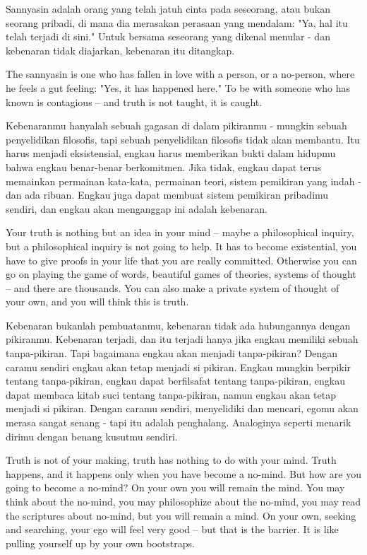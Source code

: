 \bahasa
Sannyasin adalah orang yang telah jatuh cinta pada seseorang, atau bukan seorang pribadi, di mana dia merasakan perasaan yang mendalam: "Ya, hal itu telah terjadi di sini." Untuk bersama seseorang yang dikenal menular - dan kebenaran tidak diajarkan, kebenaran itu ditangkap.

\english
The sannyasin is one who has fallen in love with a person, or a no-person, where he feels a gut feeling: "Yes, it has happened here." To be with someone who has known is contagious -- and truth is not taught, it is caught.

\bahasa
Kebenaranmu hanyalah sebuah gagasan di dalam pikiranmu - mungkin sebuah penyelidikan filosofis, tapi sebuah penyelidikan filosofis tidak akan membantu. Itu harus menjadi eksistensial, engkau harus memberikan bukti dalam hidupmu bahwa engkau benar-benar berkomitmen. Jika tidak, engkau dapat terus memainkan permainan kata-kata, permainan teori, sistem pemikiran yang indah - dan ada ribuan. Engkau juga dapat membuat sistem pemikiran pribadimu sendiri, dan engkau akan menganggap ini adalah kebenaran.

\english
Your truth is nothing but an idea in your mind -- maybe a philosophical inquiry, but a philosophical inquiry is not going to help. It has to become existential, you have to give proofs in your life that you are really committed. Otherwise you can go on playing the game of words, beautiful games of theories, systems of thought -- and there are thousands. You can also make a private system of thought of your own, and you will think this is truth.

\bahasa
Kebenaran bukanlah pembuatanmu, kebenaran tidak ada hubungannya dengan pikiranmu. Kebenaran terjadi, dan itu terjadi hanya jika engkau memiliki sebuah tanpa-pikiran. Tapi bagaimana engkau akan menjadi tanpa-pikiran? Dengan caramu sendiri engkau akan tetap menjadi si pikiran. Engkau mungkin berpikir tentang tanpa-pikiran, engkau dapat berfilsafat tentang tanpa-pikiran, engkau dapat membaca kitab suci tentang tanpa-pikiran, namun engkau akan tetap menjadi si pikiran. Dengan caramu sendiri, menyelidiki dan mencari, egomu akan merasa sangat senang - tapi itu adalah penghalang. Analoginya seperti menarik dirimu dengan benang kusutmu sendiri.

\english
Truth is not of your making, truth has nothing to do with your mind. Truth happens, and it happens only when you have become a no-mind. But how are you going to become a no-mind? On your own you will remain the mind. You may think about the no-mind, you may philosophize about the no-mind, you may read the scriptures about no-mind, but you will remain a mind. On your own, seeking and searching, your ego will feel very good -- but that is the barrier. It is like pulling yourself up by your own bootstraps.

